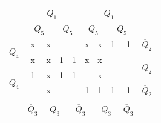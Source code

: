 \documentclass[a4paper,14pt]{article}
\begin{document}
\begin{table}[H]
\begin{minipage}{.5\linewidth}
\begin{tabular}{cccccccccc}
\end{tabular}
	\end{minipage}%
	\begin{minipage}{.5\linewidth}
		\centering
\begin{tabular}{cccccccccc}
	& \multicolumn{4}{c}{$Q_1$}                                                                         & \multicolumn{4}{c}{$\overline{Q}_1$}                                                              &                        \\
	& \multicolumn{2}{c}{$Q_5$}                       & \multicolumn{2}{c}{$\overline{Q}_5$}            & \multicolumn{2}{c}{$Q_5$}                       & \multicolumn{2}{c}{$\overline{Q}_5$}            &                        \\ \cline{2-9}
	\multicolumn{1}{c|}{\multirow{2}{*}{$Q_4$}}            & \multicolumn{1}{c|}{x} & \multicolumn{1}{c|}{x} & \multicolumn{1}{c|}{}  & \multicolumn{1}{c|}{}  & \multicolumn{1}{c|}{x} & \multicolumn{1}{c|}{x} & \multicolumn{1}{c|}{1} & \multicolumn{1}{c|}{1} & $\overline{Q}_2$       \\ \cline{2-9}
	\multicolumn{1}{c|}{}                                  & \multicolumn{1}{c|}{x} & \multicolumn{1}{c|}{x} & \multicolumn{1}{c|}{1} & \multicolumn{1}{c|}{1} & \multicolumn{1}{c|}{x} & \multicolumn{1}{c|}{x} & \multicolumn{1}{c|}{}  & \multicolumn{1}{c|}{}  & \multirow{2}{*}{$Q_2$} \\ \cline{2-9}
	\multicolumn{1}{c|}{\multirow{2}{*}{$\overline{Q}_4$}} & \multicolumn{1}{c|}{1} & \multicolumn{1}{c|}{x} & \multicolumn{1}{c|}{1} & \multicolumn{1}{c|}{1} & \multicolumn{1}{c|}{}  & \multicolumn{1}{c|}{x} & \multicolumn{1}{c|}{}  & \multicolumn{1}{c|}{}  &                        \\ \cline{2-9}
	\multicolumn{1}{c|}{}                                  & \multicolumn{1}{c|}{}  & \multicolumn{1}{c|}{x} & \multicolumn{1}{c|}{}  & \multicolumn{1}{c|}{}  & \multicolumn{1}{c|}{1} & \multicolumn{1}{c|}{1} & \multicolumn{1}{c|}{1} & \multicolumn{1}{c|}{1} & $\overline{Q}_2$       \\ \cline{2-9}
	&                        & \multicolumn{2}{c}{}                            & \multicolumn{2}{c}{}                            & \multicolumn{2}{c}{}                            &                        &                        \\
	& $\overline{Q}_3$       & \multicolumn{2}{c}{$Q_3$}                       & \multicolumn{2}{c}{$\overline{Q}_3$}            & \multicolumn{2}{c}{$Q_3$}                       & $\overline{Q}_3$       &                       
\end{tabular}
	\end{minipage} 
\end{table}
\end{document}
